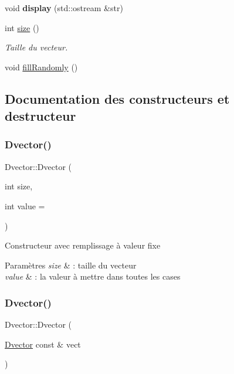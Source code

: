 \begin{DoxyCompactItemize}
\mbox{\label{class_dvector_af66e4bdf60171463c01eea1039eecdb1}} 
void {\bfseries display} (std\+::ostream \&str)
\item 
\mbox{\label{class_dvector_a964b4f5cc235ba6aaf9c5e437318be87}} 
int \hyperlink{class_dvector_a964b4f5cc235ba6aaf9c5e437318be87}{size} ()
\begin{DoxyCompactList}\small\item\em Taille du vecteur. \end{DoxyCompactList}\item 
void \hyperlink{class_dvector_a6fecdca0fbad7f928403597e322234b1}{fill\+Randomly} ()
\end{DoxyCompactItemize}


\subsection{Documentation des constructeurs et destructeur}
\mbox{\label{class_dvector_a8a4feb509178ccc26a7d3805548fab17}} 
\subsubsection{\texorpdfstring{Dvector()}{Dvector()}\hspace{0.1cm}{\footnotesize\ttfamily [1/2]}}
{\footnotesize\ttfamily Dvector\+::\+Dvector (\begin{DoxyParamCaption}\item[{int}]{size,  }\item[{int}]{value = {} }\end{DoxyParamCaption})}

Constructeur avec remplissage à valeur fixe 
\begin{DoxyParams}{Paramètres}
{\em size} & \+: taille du vecteur \\
\hline
{\em value} & \+: la valeur à mettre dans toutes les cases \\
\hline
\end{DoxyParams}
\mbox{\label{class_dvector_aa3a4f95e9bfe8139537593f86640d3af}} 
\subsubsection{\texorpdfstring{Dvector()}{Dvector()}\hspace{0.1cm}{\footnotesize\ttfamily [2/2]}}
{\footnotesize\ttfamily Dvector\+::\+Dvector (\begin{DoxyParamCaption}\item[{\hyperlink{class_dvector}{Dvector} const \&}]{vect }\end{DoxyParamCaption})}



